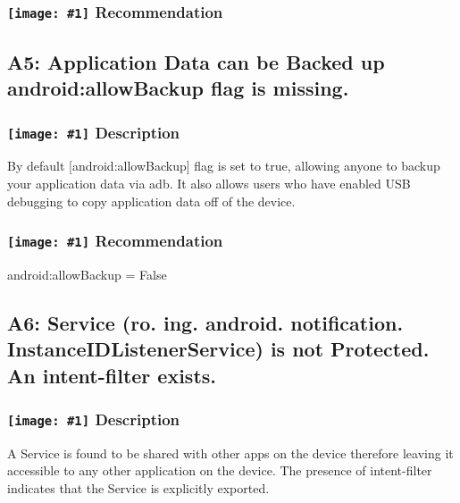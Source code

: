 \documentclass[12p]{article}
\newcommand{\icon}[1]{\texttt{[image: \#1]}}
\begin{document}


\subsubsection*{\protect\icon{/home/miki/Documents/GITHUB/AndroidPermissions/python/vulns/report_icons/basic_todo.png} Recommendation}

\subsection{A5: Application Data can be Backed up android:allowBackup flag is missing.}
\subsubsection*{\protect\icon{/home/miki/Documents/GITHUB/AndroidPermissions/python/vulns/report_icons/basic_sheet.png} Description}
By default [android:allowBackup] flag is set to true, allowing anyone to backup your application data via adb. It also allows users who have enabled USB debugging to copy application data off of the device.
\subsubsection*{\protect\icon{/home/miki/Documents/GITHUB/AndroidPermissions/python/vulns/report_icons/basic_todo.png} Recommendation}
android:allowBackup = False
\subsection{A6: Service (ro. ing. android. notification. InstanceIDListenerService) is not Protected. An intent-filter exists.}
\subsubsection*{\protect\icon{/home/miki/Documents/GITHUB/AndroidPermissions/python/vulns/report_icons/basic_sheet.png} Description}
A  Service is found to be shared with other apps on the device therefore leaving it accessible to any other application on the device. The presence of intent-filter indicates that the Service is explicitly exported.
\end{document}
